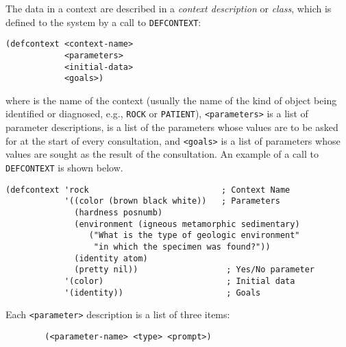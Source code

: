 The data in a context are described in a {\em context description} or
{\em class}, which is defined to the system by a call to {\tt DEFCONTEXT}:

\begin{verbatim}
(defcontext <context-name>
            <parameters>
            <initial-data>
            <goals>)
\end{verbatim}

where {\tt <context-name>} is the name of the context (usually the name of
the kind of object being identified or diagnosed, e.g., {\tt ROCK} or
{\tt PATIENT}), {\tt <parameters>} is a list of parameter descriptions,
{\tt <initial-data>} is a list of the parameters whose values are to be
asked for at the start of every consultation, and {\tt <goals>} is a list
of parameters whose values are sought as the result of the consultation.
An example of a call to {\tt DEFCONTEXT} is shown below.

\pagebreak

\begin{verbatim}
(defcontext 'rock                           ; Context Name
            '((color (brown black white))   ; Parameters
              (hardness posnumb)
              (environment (igneous metamorphic sedimentary)
                 ("What is the type of geologic environment"
                  "in which the specimen was found?"))
              (identity atom)
              (pretty nil))                  ; Yes/No parameter
            '(color)                         ; Initial data
            '(identity))                     ; Goals
\end{verbatim}

Each {\tt <parameter>} description is a list of three items:
\begin{verbatim}
        (<parameter-name> <type> <prompt>)
\end{verbatim}

